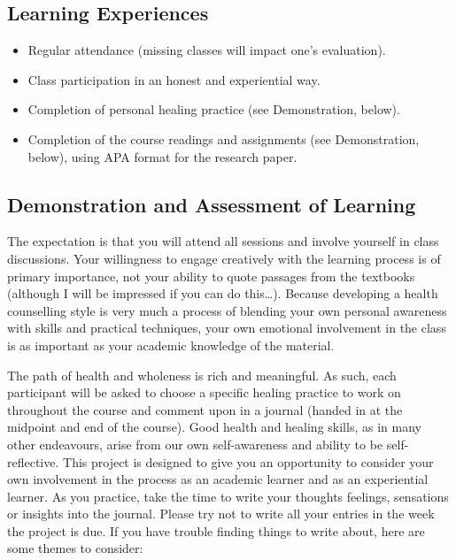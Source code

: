 \documentclass[10pt,DIV09,letterpaper,oneside,headsepline]{scrreprt}
\begin{document}
\subsection{Learning Experiences}

\begin{itemize}
\item Regular attendance (missing classes will impact one's evaluation).

\item Class participation in an honest and experiential way.

\item Completion of personal healing practice (see Demonstration, below).

\item Completion of the course readings and assignments (see Demonstration, below), using APA format for the research paper.

\end{itemize}

\subsection{Demonstration and Assessment of Learning}

The expectation is that you will attend all sessions and involve yourself in class discussions. Your willingness to engage creatively with the learning process is of primary importance, not your ability to quote passages from the textbooks (although I will be impressed if you can do this\ldots). Because developing a health counselling style is very much a process of blending your own personal awareness with skills and practical techniques, your own emotional involvement in the class is as important as your academic knowledge of the material.

The path of health and wholeness is rich and meaningful. As such, each participant will be asked to choose a specific healing practice to work on throughout the course and comment upon in a journal (handed in at the midpoint and end of the course). Good health and healing skills, as in many other endeavours, arise from our own self-awareness and ability to be self-reflective. This project is designed to give you an opportunity to consider your own involvement in the process as an academic learner and as an experiential learner. As you practice, take the time to write your thoughts feelings, sensations or insights into the journal. Please try not to write all your entries in the week the project is due. If you have trouble finding things to write about, here are some themes to consider:
\end{document}
